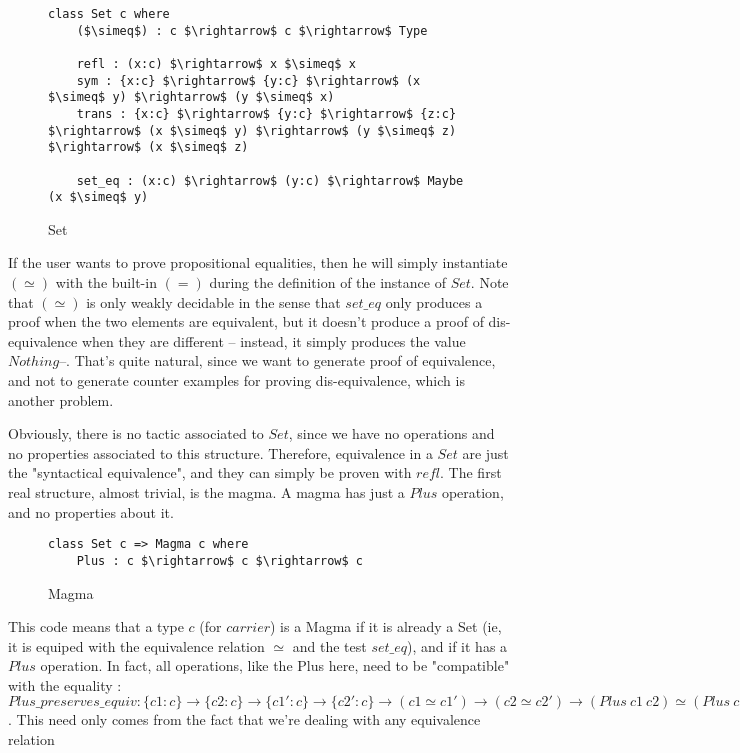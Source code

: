 \begin{figure}[H]
\figrule
\begin{center}
\begin{lstlisting}
class Set c where
    ($\simeq$) : c $\rightarrow$ c $\rightarrow$ Type

    refl : (x:c) $\rightarrow$ x $\simeq$ x
    sym : {x:c} $\rightarrow$ {y:c} $\rightarrow$ (x $\simeq$ y) $\rightarrow$ (y $\simeq$ x)
    trans : {x:c} $\rightarrow$ {y:c} $\rightarrow$ {z:c} $\rightarrow$ (x $\simeq$ y) $\rightarrow$ (y $\simeq$ z) $\rightarrow$ (x $\simeq$ z)    
    
    set_eq : (x:c) $\rightarrow$ (y:c) $\rightarrow$ Maybe (x $\simeq$ y)
\end{lstlisting}
\end{center}
\caption{Set}
\figrule
\end{figure}
If the user wants to prove propositional equalities, then he will simply instantiate $(\simeq)$ with the built-in $(=)$ during the definition of the instance of $Set$.
Note that $(\simeq)$ is only weakly decidable in the sense that $set\_eq$ only produces a proof when the two elements are equivalent, but it doesn't produce a proof of dis-equivalence when they are different -- instead, it simply produces the value $Nothing$--. That's quite natural, since we want to generate proof of equivalence, and not to generate counter examples for proving dis-equivalence, which is another problem.

Obviously, there is no tactic associated to $Set$, since we have no operations and no properties associated to this structure. Therefore, equivalence in a $Set$ are just the "syntactical equivalence", and they can simply be proven with $refl$.
The first real structure, almost trivial, is the magma. A magma has just a $Plus$ operation, and no properties about it.

\begin{figure}[H]
\figrule
\begin{center}
\begin{lstlisting}
class Set c => Magma c where
    Plus : c $\rightarrow$ c $\rightarrow$ c
\end{lstlisting}
\end{center}
\caption{Magma}
\figrule
\end{figure}

This code means that a type $c$ (for $carrier$) is a Magma if it is already a Set (ie, it is equiped with the equivalence relation $\simeq$ and the test $set\_eq$), and if it has a $Plus$ operation.
In fact, all operations, like the Plus here, need to be "compatible" with the equality : $Plus\_preserves\_equiv : \{c1:c\} \rightarrow \{c2:c\} \rightarrow \{c1':c\} \rightarrow \{c2':c\} \rightarrow (c1 \simeq c1') \rightarrow (c2 \simeq c2') \rightarrow (Plus\ c1\ c2) \simeq (Plus\ c1'\ c2')$. This need only comes from the fact that we're dealing with any equivalence relation

